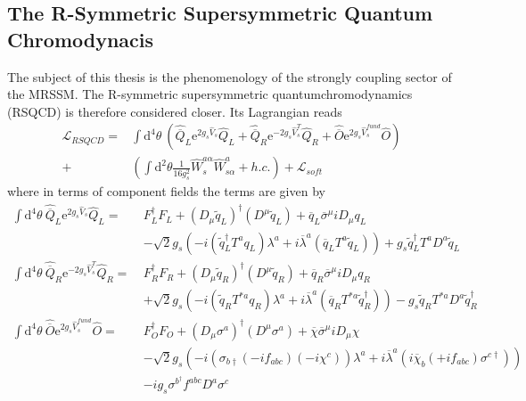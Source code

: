 \subsection{The R-Symmetric Supersymmetric Quantum Chromodynacis}
The subject of this thesis is the phenomenology of the strongly coupling sector of the MRSSM. The R-symmetric supersymmetric quantumchromodynamics (RSQCD) is therefore considered closer. Its Lagrangian reads
\begin{align}
\mathcal{L}_{RSQCD} = &\int\mathrm{d}^4\theta\ \left( \hat{\overline{Q}}_L \mathrm{e}^{2g_s\hat{V}_s} \hat{Q}_L + \hat{\overline{Q}}_R \mathrm{e}^{-2g_s\hat{V}^T_s} \hat{Q}_R + \hat{\overline{O}} \mathrm{e}^{2g_s\hat{V}^{fund}_s} \hat{O}\right)\nonumber\\
+& \left( \int \mathrm{d}^2\theta \frac{1}{16g_s^2} \hat{W}_s^{a\alpha}\hat{W}^a_{s\alpha} + h.c. \right) + \mathcal{L}_{soft}
\end{align}
where in terms of component fields the terms are given by
\begin{align}
\int\mathrm{d}^4\theta\ \hat{\overline{Q}}_L \mathrm{e}^{2g_s\hat{V}_s} \hat{Q}_L =\ & F_L^\dagger F_L + (D_\mu \tilde{q}_L)^\dagger (D^\mu \tilde{q}_L) + \overline{q}_L \overline{\sigma}^\mu i D_\mu q_L\nonumber\\
&-\sqrt{2}g_s \left( -i (\tilde{q}_L^\dagger T^a q_L ) \lambda^a + i \overline{\lambda}^a (\overline{q}_L T^a \tilde{q}_L) \right) + g_s\tilde{q}_L^\dagger T^a D^a \tilde{q}_L\label{eq:RSQCD_Feynmanrules1}\\
\int\mathrm{d}^4\theta\ \hat{\overline{Q}}_R \mathrm{e}^{-2g_s\hat{V}^T_s} \hat{Q}_R =\  & F_R^\dagger F_R + (D_\mu \tilde{q}_R)^\dagger (D^\mu \tilde{q}_R) + \overline{q}_R \overline{\sigma}^\mu i D_\mu q_R\nonumber\\
&+\sqrt{2}g_s \left( -i (\tilde{q}_R T^{\ast a} q_R ) \lambda^a + i \overline{\lambda}^a (\overline{q}_R T^{\ast a} \tilde{q}_R^\dagger) \right) - g_s \tilde{q}_R T^{\ast a} D^a \tilde{q}_R^\dagger\label{eq:RSQCD_Feynmanrules2}\\
\int\mathrm{d}^4\theta\ \hat{\overline{O}} \mathrm{e}^{2g_s\hat{V}^{fund}_s} \hat{O} =\  & F_O^\dagger F_O + (D_\mu \sigma^a)^\dagger (D^\mu \sigma^a) + \overline{\chi} \overline{\sigma}^\mu i D_\mu \chi\nonumber\\
&-\sqrt{2}g_s \left( -i (\sigma_{b\dagger} (-if_{abc}) (-i\chi^c) ) \lambda^a + i \overline{\lambda}^a (i\overline{\chi}_b (+if_{abc}) \sigma^{c\dagger}) \right)\nonumber\\
&-ig_s\sigma^{b^\dagger} f^{abc}D^a\sigma^c
\end{align}
